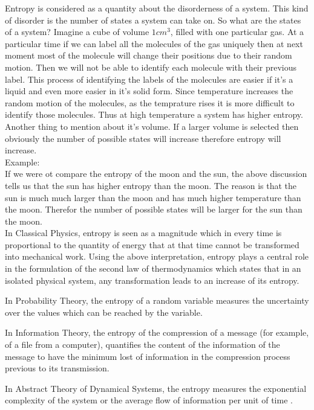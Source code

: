 	Entropy is considered as a quantity about the disorderness of a system. This kind of disorder is the number of states a system can take on. So what are the states of a system? Imagine a cube of volume $1cm^3$, filled with one particular gas. At a particular time if we can label all the molecules of the gas uniquely then at next moment most of the molecule will change their positions due to their random motion. Then we will not be able to identify each molecule with their previous label. This process of identifying the labels of the molecules are easier if it's a liquid and even more easier in it's solid form. Since temperature increases the random motion of the molecules, as the temprature rises it is more difficult to identify those molecules. Thus at high temperature a system has higher entropy. Another thing to mention about it's volume. If a larger volume is selected then obviously the number of possible states will increase therefore entropy will increase.\\
	Example:\\
	If we were ot compare the entropy of the moon and the sun, the above discussion tells us that the sun has higher entropy than the moon. The reason is that the sun is much much larger than the moon and has much higher temperature than the moon. Therefor the number of possible states will be larger for the sun than the moon.\\
	
	In Classical Physics, entropy is seen as a magnitude which in every time is proportional to	the quantity of energy that at that time cannot be transformed into mechanical work. Using the	above interpretation, entropy plays a central role in the formulation of the second law of thermodynamics which states that in an isolated physical system, any transformation leads to an increase	of its entropy. 
	
	In Probability Theory, the entropy of a random variable measures the uncertainty over the	values which can be reached by the variable.
	
	In Information Theory, the entropy of the compression of a message (for example, of a file	from a computer), quantifies the content of the information of the message to have the minimum	lost of information in the compression process previous to its transmission.
	
	In Abstract Theory of Dynamical Systems, the entropy measures the exponential complexity	of the system or the average flow of information per unit of time \cite{Balibrea2016}.
	
